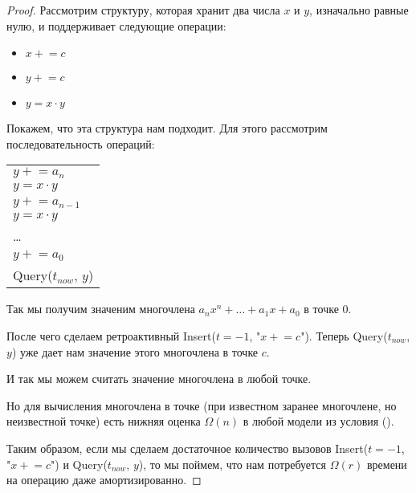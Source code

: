 \begin{proof}

Рассмотрим структуру, которая хранит два числа $x$ и $y$, изначально равные нулю, и поддерживает следующие операции:

\newcommand{\pluseq}{\mathrel{+}=}

\begin{itemize}

\item $x \pluseq c$
\item $y \pluseq c$
\item $y = x \cdot y$

\end{itemize}

Покажем, что эта структура нам подходит.
Для этого рассмотрим последовательность операций:

\begin{tabular}{ l }

$y \pluseq a_n$\\
$y = x \cdot y$\\
$y \pluseq a_{n - 1}$\\
$y = x \cdot y$\\
\dots\\
$y \pluseq a_0$\\
Query($t_{now}$, $y$)

\end{tabular}

\vspace{10pt}
Так мы получим значеним многочлена $a_n x^n + \dots + a_1 x + a_0$ в точке 0.

После чего сделаем ретроактивный Insert($t = -1$, "$x \pluseq c$").
Теперь Query($t_{now}$, $y$) уже дает нам значение этого многочлена в точке $c$.

И так мы можем считать значение многочлена в любой точке.

Но для вычисления многочлена в точке (при известном заранее многочлене, но неизвестной точке) есть нижняя оценка $\Omega(n)$ в любой модели из условия (\cite{frandsen2001lower}).

Таким образом, если мы сделаем достаточное количество вызовов Insert($t = -1$, "$x \pluseq c$") и Query($t_{now}$, $y$), то мы поймем, что нам потребуется $\Omega(r)$ времени на операцию даже амортизированно.
\end{proof}

